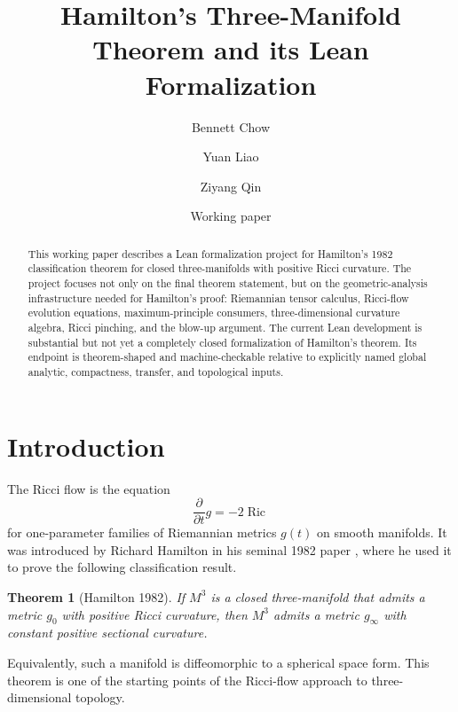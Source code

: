\documentclass[11pt]{article}
\title{Hamilton's Three-Manifold Theorem and its Lean Formalization}
\author{Bennett Chow \and Yuan Liao \and Ziyang Qin}
\date{Working paper}
\theoremstyle{plain}
\newtheorem{theorem}{Theorem}[section]
\theoremstyle{definition}
\theoremstyle{remark}
\newcommand{\Ric}{\operatorname{Ric}}
\begin{document}
\maketitle

\begin{abstract}
This working paper describes a Lean formalization project for Hamilton's 1982
classification theorem for closed three-manifolds with positive Ricci
curvature.  The project focuses not only on the final theorem statement, but on
the geometric-analysis infrastructure needed for Hamilton's proof: Riemannian
tensor calculus, Ricci-flow evolution equations, maximum-principle consumers,
three-dimensional curvature algebra, Ricci pinching, and the blow-up argument.
The current Lean development is substantial but not yet a completely closed
formalization of Hamilton's theorem.  Its endpoint is theorem-shaped and
machine-checkable relative to explicitly named global analytic, compactness,
transfer, and topological inputs.
\end{abstract}

\tableofcontents

\section{Introduction}

The Ricci flow is the equation
\begin{equation}
    \frac{\partial}{\partial t} g = - 2 \Ric
\end{equation}
for one-parameter families of Riemannian metrics $g(t)$ on smooth manifolds.
It was introduced by Richard Hamilton in his seminal 1982 paper
\cite{MR664497}, where he used it to prove the following classification
result.
\begin{theorem}[Hamilton 1982]
   If $M^3$ is a closed three-manifold that admits a metric $g_0$ with positive
   Ricci curvature, then $M^3$ admits a metric $g_\infty$ with constant
   positive sectional curvature.
\end{theorem}
Equivalently, such a manifold is diffeomorphic to a spherical space form.  This
theorem is one of the starting points of the Ricci-flow approach to
three-dimensional topology.
\end{document}
